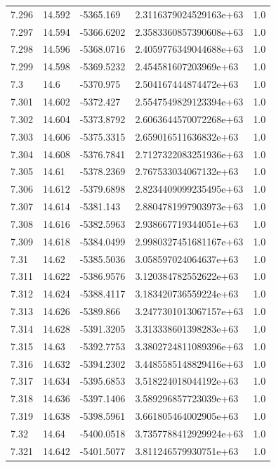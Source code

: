 \begin{tabular}{lllll}
7.296 & 14.592 & -5365.169 & 2.3116379024529163e+63 & 1.0 \\
7.297 & 14.594 & -5366.6202 & 2.3583360857390608e+63 & 1.0 \\
7.298 & 14.596 & -5368.0716 & 2.4059776349044688e+63 & 1.0 \\
7.299 & 14.598 & -5369.5232 & 2.454581607203969e+63 & 1.0 \\
7.3 & 14.6 & -5370.975 & 2.504167444874472e+63 & 1.0 \\
7.301 & 14.602 & -5372.427 & 2.5547549829123394e+63 & 1.0 \\
7.302 & 14.604 & -5373.8792 & 2.6063644570072268e+63 & 1.0 \\
7.303 & 14.606 & -5375.3315 & 2.659016511636832e+63 & 1.0 \\
7.304 & 14.608 & -5376.7841 & 2.7127322083251936e+63 & 1.0 \\
7.305 & 14.61 & -5378.2369 & 2.767533034067132e+63 & 1.0 \\
7.306 & 14.612 & -5379.6898 & 2.8234409099235495e+63 & 1.0 \\
7.307 & 14.614 & -5381.143 & 2.8804781997903973e+63 & 1.0 \\
7.308 & 14.616 & -5382.5963 & 2.938667719344051e+63 & 1.0 \\
7.309 & 14.618 & -5384.0499 & 2.9980327451681167e+63 & 1.0 \\
7.31 & 14.62 & -5385.5036 & 3.058597024064637e+63 & 1.0 \\
7.311 & 14.622 & -5386.9576 & 3.120384782552622e+63 & 1.0 \\
7.312 & 14.624 & -5388.4117 & 3.183420736559224e+63 & 1.0 \\
7.313 & 14.626 & -5389.866 & 3.2477301013067157e+63 & 1.0 \\
7.314 & 14.628 & -5391.3205 & 3.313338601398283e+63 & 1.0 \\
7.315 & 14.63 & -5392.7753 & 3.3802724811089396e+63 & 1.0 \\
7.316 & 14.632 & -5394.2302 & 3.4485585148829416e+63 & 1.0 \\
7.317 & 14.634 & -5395.6853 & 3.518224018044192e+63 & 1.0 \\
7.318 & 14.636 & -5397.1406 & 3.589296857723039e+63 & 1.0 \\
7.319 & 14.638 & -5398.5961 & 3.661805464002905e+63 & 1.0 \\
7.32 & 14.64 & -5400.0518 & 3.7357788412929924e+63 & 1.0 \\
7.321 & 14.642 & -5401.5077 & 3.811246579930751e+63 & 1.0 \\

\end{tabular}
